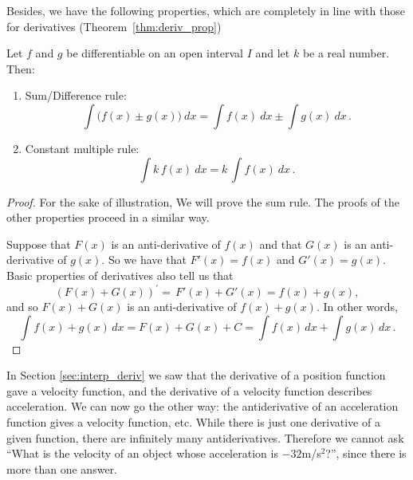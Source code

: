 Besides, we have the following properties, which are completely in line with those for derivatives (Theorem~\ref{thm:deriv_prop})
\begin{theorem}\label{thm:antideriv_prop}
Let $f$ and $g$ be differentiable on an open interval $I$ and let $k$ be a real number. Then:
	\begin{enumerate}
	\item	Sum/Difference rule:
	\begin{equation}
	\int \big(f(x)\pm g(x)\big)\ dx = \int f(x)\ dx\pm \int g(x)\ dx\,.
	\label{primitievesom}
	\end{equation}
	\item		Constant multiple rule:
	\begin{equation}
\int k\, f(x)\ dx = k\, \int f(x)\ dx\,.
	\label{primitievesom2}
	\end{equation}
	\end{enumerate}
\end{theorem}

\ifanalysis

\begin{proof}
For the sake of illustration, We will prove the sum rule. The proofs of the other properties proceed in a similar way.  

Suppose that $F(x)$ is an anti-derivative of $f(x)$ and that $G(x)$ is an anti-derivative of $g(x)$. So we have that $F'(x)=f(x)$ and $G'(x)=g(x)$. Basic properties of derivatives also tell us that
$$
{\left( {F\left( x \right) + G\left( x \right)} \right)^\prime } = \,F'\left( x \right) + G'\left( x \right) = f\left( x \right) + g\left( x \right),
$$
and so $F(x)+G(x)$ is an anti-derivative of $f(x)+g(x)$. In other words,
$$
\int{{f\left( x \right) +g\left( x \right)\,dx}} = F\left( x \right) + G\left( x \right) + C = \int{{f\left( x \right)\,dx}} + \int{{g\left( x \right)\,dx}}\,.
$$
\phantom{}
\end{proof}


\fi


In Section \ref{sec:interp_deriv} we saw that the derivative of a position function gave a velocity function, and the derivative of a velocity function describes  acceleration. We can now go the other way: the antiderivative of an acceleration function gives a velocity function, etc. While there is just one derivative of a given function, there are infinitely many antiderivatives. Therefore we cannot ask ``What is the velocity of an object whose acceleration is $-32$m/s$^2$?'', since there is more than one answer. 

